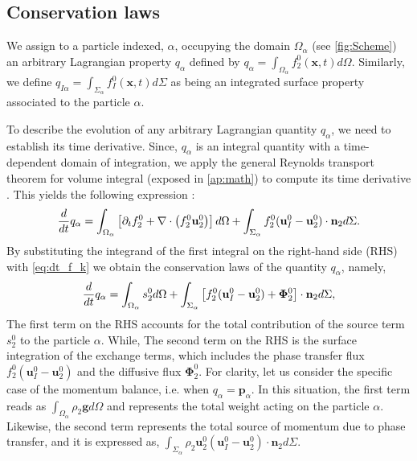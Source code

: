 \subsection{Conservation laws}
We assign to a particle indexed, $\alpha$, occupying the domain $\Omega_\alpha$ (see \ref{fig:Scheme}) an arbitrary Lagrangian property $q_\alpha$ defined by $q_\alpha  = \int_{\Omega_\alpha} f_2^0(\textbf{x},t) d\Omega$.
Similarly, we define $q_{I\alpha} = \int_{\Sigma_\alpha} f_I^0(\textbf{x},t) d\Sigma$ as being an integrated surface property associated to the particle $\alpha$.


To describe the evolution of any arbitrary Lagrangian quantity $q_\alpha$, we need to establish its time derivative.
Since, $q_\alpha$ is an integral quantity with a time-dependent domain of integration, we apply the general Reynolds transport theorem for volume integral (exposed in \ref{ap:math}) to compute its time derivative \citep{morel2015mathematical}.
This yields the following expression :
\begin{equation}
    \frac{d}{d t}  q_\alpha
    = \int_{\Omega_\alpha}\left[ \partial_t f_2^0 + \mathbf{\nabla}\cdot\left(f_2^0\textbf{u}_2^0\right) \right]d\Omega\\
    + \int_{\Sigma_\alpha} f_2^0 (\textbf{u}_I^0-\textbf{u}_2^0)\cdot \textbf{n}_2 d\Sigma.
\end{equation}
By substituting the integrand of the first integral on the right-hand side (RHS) with \ref{eq:dt_f_k} we obtain the conservation laws of the quantity $q_\alpha$, namely,  
\begin{equation}
    \frac{d}{d t}  q_\alpha
    = \int_{\Omega_\alpha} s_2^0 d\Omega
    + \int_{\Sigma_\alpha} \left[
        f_2^0 (\textbf{u}_I^0-\textbf{u}_2^0) 
        + \mathbf{\Phi}_2^0 
        \right] \cdot \textbf{n}_2 d\Sigma,
    \label{eq:dt_q_alpha}
\end{equation}
The first term on the RHS accounts for the total contribution of the source term $s_2^0$ to the particle $\alpha$.
While, The second term on the RHS is the surface integration of the exchange terms, which includes the phase transfer flux $f_2^0 (\textbf{u}_I^0-\textbf{u}_2^0)$ and the diffusive flux $\mathbf{\Phi}_2^0$. 
For clarity, let us consider the specific case of the momentum balance, i.e. when $q_\alpha = \textbf{p}_\alpha$.
In this situation, the first term reads as $\int_{\Omega_\alpha} \rho_2\textbf{g} d\Omega$ and represents the total weight acting on the particle $\alpha$. 
Likewise, the second term represents the total source of momentum due to phase transfer, and it is expressed as, $\int_{\Sigma_\alpha} \rho_2 \textbf{u}_2^0 (\textbf{u}_I^0-\textbf{u}_2^0)\cdot\textbf{n}_2 d\Sigma$. 

